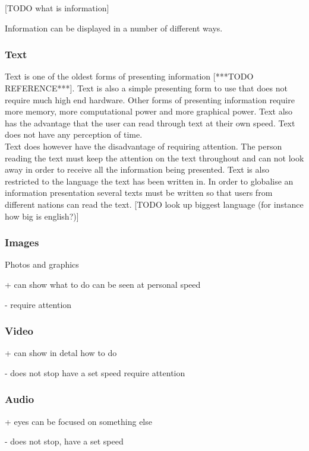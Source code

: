 [TODO what is information]

Information can be displayed in a number of different ways.

\subsubsection{Text}
Text is one of the oldest forms of presenting information [***TODO REFERENCE***]. Text is also a simple presenting form to use that does not require much high end hardware. Other forms of presenting information require more memory, more computational power and more graphical power. Text also has the advantage that the user can read through text at their own speed. Text does not have any perception of time.\\

Text does however have the disadvantage of requiring attention. The person reading the text must keep the attention on the text throughout and can not look away in order to receive all the information being presented. Text is also restricted to the language the text has been written in. In order to globalise an information presentation several texts must be written so that users from different nations can read the text. [TODO look up biggest language (for instance how big is english?)]

\subsubsection{Images}
Photos and graphics

+
can show what to do
can be seen at personal speed

-
require attention

\subsubsection{Video}

+
can show in detal how to do

-
does not stop have a set speed
require attention

\subsubsection{Audio}

+
eyes can be focused on something else

-
does not stop, have a set speed